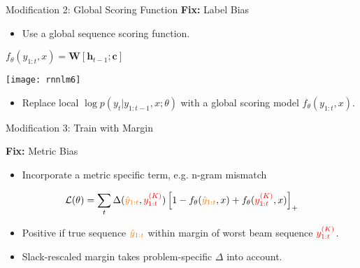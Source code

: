 \begin{frame}{Modification 2: Global Scoring Function  }
  \textbf{Fix:}  Label Bias
    \begin{itemize}
    \item Use a global sequence scoring function.
    \end{itemize}
    \pause


    \air

  \begin{center}
    $f_{\theta}(y_{1:t}, x)= \mathbf{W} [\mathbf{h}_{t-1}; \mathbf{c}]$

    \texttt{[image: rnnlm6]}
  \end{center}


  \begin{itemize}
  \item Replace local $ \log p(y_{t} | y_{1:t-1}, x; \theta)$ with
    a global scoring model $f_{\theta}(y_{1:t}, x)$.
  \end{itemize}
  \air



\end{frame}



\begin{frame}{Modification 3: Train with Margin}

  \textbf{Fix:} Metric Bias
  \begin{itemize}
  \item Incorporate a metric specific term, e.g. n-gram mismatch
  \end{itemize}
  \air
  \pause

  \[ \mathcal{L}(\theta) = \sum_{t} \Delta(\textcolor{gold}{\hat{y}_{1:t}}, \textcolor{red}{y_{1:t}^{(K)}}) \left[1 - f_{\theta}( \textcolor{gold}{\hat{y}_{1:t}}, x) +  f_{\theta}(\textcolor{red}{y_{1:t}^{(K)}}, x) \right]_{+} \]

  \begin{itemize}
  \item Positive if true sequence $\textcolor{gold}{\hat{y}_{1:t}}$ within margin of worst beam sequence $\textcolor{red}{y^{(K)}_{1:t}}$.
  \item Slack-rescaled margin takes problem-specific $\Delta$ into account.
  \end{itemize}

\end{frame}

